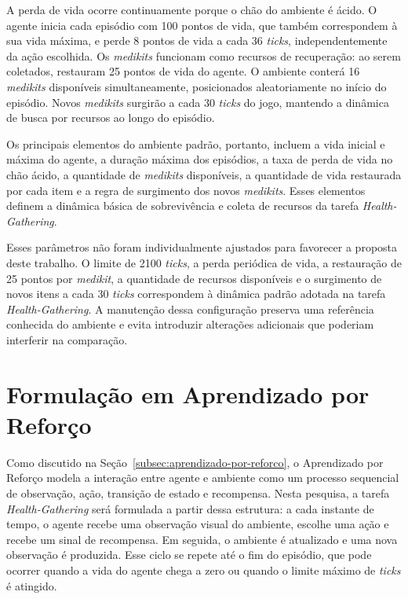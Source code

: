 A perda de vida ocorre continuamente porque o chão do ambiente é ácido. O agente inicia cada episódio com 100 pontos de vida, que também correspondem à sua vida máxima, e perde 8 pontos de vida a cada 36 \textit{ticks}, independentemente da ação escolhida. Os \textit{medikits} funcionam como recursos de recuperação: ao serem coletados, restauram 25 pontos de vida do agente. O ambiente conterá 16 \textit{medikits} disponíveis simultaneamente, posicionados aleatoriamente no início do episódio. Novos \textit{medikits} surgirão a cada 30 \textit{ticks} do jogo, mantendo a dinâmica de busca por recursos ao longo do episódio.

Os principais elementos do ambiente padrão, portanto, incluem a vida inicial e máxima do agente, a duração máxima dos episódios, a taxa de perda de vida no chão ácido, a quantidade de \textit{medikits} disponíveis, a quantidade de vida restaurada por cada item e a regra de surgimento dos novos \textit{medikits}. Esses elementos definem a dinâmica básica de sobrevivência e coleta de recursos da tarefa \textit{Health-Gathering}.

Esses parâmetros não foram individualmente ajustados para favorecer a proposta deste trabalho. O limite de 2100 \textit{ticks}, a perda periódica de vida, a restauração de 25 pontos por \textit{medikit}, a quantidade de recursos disponíveis e o surgimento de novos itens a cada 30 \textit{ticks} correspondem à dinâmica padrão adotada na tarefa \textit{Health-Gathering}. A manutenção dessa configuração preserva uma referência conhecida do ambiente e evita introduzir alterações adicionais que poderiam interferir na comparação. 

\section{Formulação em Aprendizado por Reforço}

Como discutido na Seção~\ref{subsec:aprendizado-por-reforco}, o Aprendizado por Reforço modela a interação entre agente e ambiente como um processo sequencial de observação, ação, transição de estado e recompensa. Nesta pesquisa, a tarefa \textit{Health-Gathering} será formulada a partir dessa estrutura: a cada instante de tempo, o agente recebe uma observação visual do ambiente, escolhe uma ação e recebe um sinal de recompensa. Em seguida, o ambiente é atualizado e uma nova observação é produzida. Esse ciclo se repete até o fim do episódio, que pode ocorrer quando a vida do agente chega a zero ou quando o limite máximo de \textit{ticks} é atingido.

